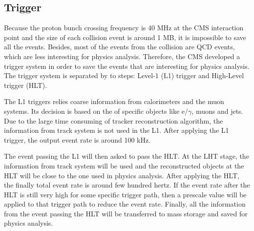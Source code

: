 \subsection{Trigger}\label{subsec:CMS_trigger}

Because the proton bunch crossing frequency is 40 MHz at the CMS interaction point and the size of each collision event is around 1 MB, it is impossible to save all the events. Besides, most of the events from the collision are QCD events, which are less interesting for physics analysis. Therefore, the CMS developed a trigger system in order to save the events that are interesting for physics analysis. The trigger system is separated by to steps: Level-1 (L1) trigger and High-Level trigger (HLT).


The L1 triggers relies coarse information from calorimeters and the muon systems. Its decision is based on the \pt of specific objects like  e/$\gamma$, muons and jets. Due to the large time consuming of tracker reconstruction algorithm, the information from track system is not used in the L1. After applying the L1 trigger, the output event rate is around 100 kHz.

The event passing the L1 will then asked to pass the HLT. At the LHT stage, the information from track system will be used and the reconstructed objects at the HLT will be close to the one used in physics analysis. After applying the HLT, the finally total event rate is around few hundred hertz. If the event rate after the HLT is still very high for some specific trigger path, then a prescale value will be applied to that trigger path to reduce the event rate. Finally, all the information from the event passing the HLT will be transferred to mass storage and saved for physics analysis.


